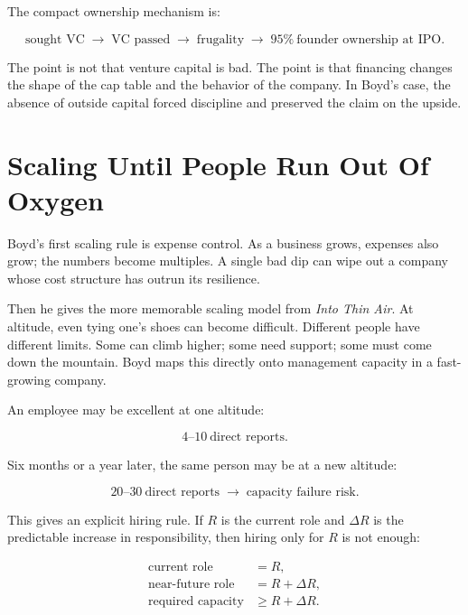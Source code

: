 The compact ownership mechanism is:

\begin{equation}
\text{sought VC}
\;\longrightarrow\;
\text{VC passed}
\;\longrightarrow\;
\text{frugality}
\;\longrightarrow\;
95\%\ \text{founder ownership at IPO}.
\end{equation}

The point is not that venture capital is bad. The point is that financing changes the shape of the cap table and the behavior of the company. In Boyd's case, the absence of outside capital forced discipline and preserved the claim on the upside.

\section{Scaling Until People Run Out Of Oxygen}

Boyd's first scaling rule is expense control. As a business grows, expenses also grow; the numbers become multiples. A single bad dip can wipe out a company whose cost structure has outrun its resilience.

Then he gives the more memorable scaling model from \emph{Into Thin Air}. At altitude, even tying one's shoes can become difficult. Different people have different limits. Some can climb higher; some need support; some must come down the mountain. Boyd maps this directly onto management capacity in a fast-growing company.

An employee may be excellent at one altitude:

\begin{equation}
4\text{--}10\ \text{direct reports}.
\end{equation}

Six months or a year later, the same person may be at a new altitude:

\begin{equation}
20\text{--}30\ \text{direct reports}
\;\longrightarrow\;
\text{capacity failure risk}.
\end{equation}

This gives an explicit hiring rule. If \(R\) is the current role and \(\Delta R\) is the predictable increase in responsibility, then hiring only for \(R\) is not enough:

\begin{align}
\text{current role} &= R,\\
\text{near-future role} &= R+\Delta R,\\
\text{required capacity} &\geq R+\Delta R.
\end{align}

